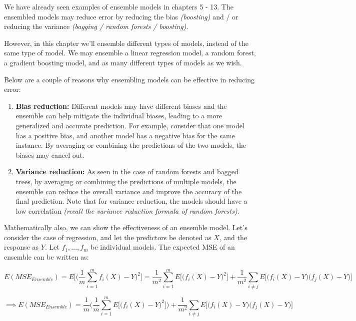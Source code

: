 \documentclass[
  letterpaper,
  DIV=11,
  numbers=noendperiod]{scrreprt}
\begin{document}
We have already seen examples of ensemble models in chapters 5 - 13. The
ensembled models may reduce error by reducing the bias \emph{(boosting)}
and / or reducing the variance \emph{(bagging / random forests /
boosting)}.

However, in this chapter we'll ensemble different types of models,
instead of the same type of model. We may ensemble a linear regression
model, a random forest, a gradient boosting model, and as many different
types of models as we wish.

Below are a couple of reasons why ensembling models can be effective in
reducing error:

\begin{enumerate}
\def\labelenumi{\arabic{enumi}.}
\item
  \textbf{Bias reduction:} Different models may have different biases
  and the ensemble can help mitigate the individual biases, leading to a
  more generalized and accurate prediction. For example, consider that
  one model has a positive bias, and another model has a negative bias
  for the same instance. By averaging or combining the predictions of
  the two models, the biases may cancel out.
\item
  \textbf{Variance reduction:} As seen in the case of random forests and
  bagged trees, by averaging or combining the predictions of multiple
  models, the ensemble can reduce the overall variance and improve the
  accuracy of the final prediction. Note that for variance reduction,
  the models should have a low correlation \emph{(recall the variance
  reduction formula of random forests)}.
\end{enumerate}

Mathematically also, we can show the effectiveness of an ensemble model.
Let's consider the case of regression, and let the predictors be denoted
as \(X\), and the response as \(Y\). Let \(f_1, ..., f_m\) be individual
models. The expected MSE of an ensemble can be written as:

\[ E(MSE_{Ensemble}) = E\bigg[\bigg( \frac{1}{m} \sum_{i = 1}^{m} f_i(X) - Y \bigg)^2 \bigg] = \frac{1}{m^2} \sum_{i = 1}^{m} E \bigg[\big(f_i(X) - Y\big)^2 \bigg] + \frac{1}{m^2} \sum_{i \ne j} E\bigg[\big(f_i(X) - Y\big)\big(f_j(X) - Y\big) \bigg]\]

\[ \implies E(MSE_{Ensemble}) = \frac{1}{m}\bigg(\frac{1}{m} \sum_{i=1}^m E \bigg[\big(f_i(X) - Y\big)^2 \bigg]\bigg) + \frac{1}{m^2} \sum_{i \ne j} E\bigg[\big(f_i(X) - Y\big)\big(f_j(X) - Y\big) \bigg]\]
\end{document}
